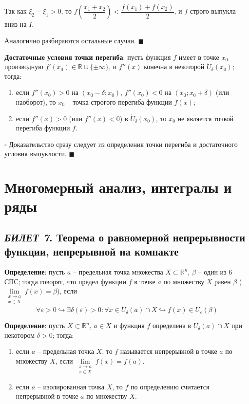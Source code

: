 \documentclass[12pt, a4paper, reqno]{article}
\begin{document}
    Так как $\xi_2 - \xi_1 > 0$, то $f\left(\dfrac{x_1 + x_2}{2}\right) < \dfrac{f(x_1) + f(x_2)}{2}$,
    и $f$ строго выпукла вниз на $I$.

    Аналогично разбираются остальные случаи. $\blacksquare$

    \textbf{Достаточные условия точки перегиба}: пусть функция $f$ имеет в точке $x_0$ производную
    $f'(x_0) \in \mathbb{R} \cup \{\pm\infty\}$, и $f''(x)$ конечна в некоторой $\mathring U_{\delta}(x_0)$;
    тогда:
    \begin{enumerate}
        \item если $f''(x_0) > 0$ на $(x_0 - \delta; x_0)$, $f''(x_0) < 0$ на $(x_0; x_0 + \delta)$
              (или наоборот), то $x_0$ -- точка строгого перегиба функции $f(x)$;
        \item если $f''(x) > 0$ (или $f''(x) < 0$) в $\mathring U_{\delta}(x_0)$, то $x_0$ не является
              точкой перегиба функции $f$.
    \end{enumerate}

    $\square$ Доказательство сразу следует из определения точки перегиба и достаточного условия
    выпуклости. $\blacksquare$

\newpage

\section{Многомерный анализ, интегралы и ряды}

\subsection{\textit{БИЛЕТ 7}. Теорема о равномерной непрерывности функции, непрерывной на компакте}

    \textbf{Определение}: пусть $a$ -- предельная точка множества $X \subset \mathbb{R}^n$,
    $\beta$ -- один из 6 СПС; тогда говорят, что предел функции $f$ в точке $a$ по множеству $X$
    равен $\beta$ ($\lim\limits_{\substack{x \to a \\ x \in X}} f(x) = \beta$), если
    \begin{equation*}
        \forall \varepsilon > 0 \hookrightarrow \exists \delta(\varepsilon) > 0 : \forall x \in
        \mathring U_{\delta}(a) \cap X \hookrightarrow f(x) \in U_{\varepsilon}(\beta)
    \end{equation*}

    \textbf{Определение}: пусть $X \subset \mathbb{R}^n$, $a \in X$ и функция $f$ определена в
    $U_{\delta}(a) \cap X$ при некотором $\delta > 0$; тогда:
    \begin{enumerate}
        \item если $a$ -- предельная точка $X$, то $f$ называется непрерывной в точке $a$ по
        множеству $X$, если $\lim\limits_{\substack{x \to a \\ x \in X}} f(x) = f(a)$.
        \item если $a$ -- изолированная точка $X$, то $f$ по определению считается непрерывной в
        точке $a$ по множеству $X$.
    \end{enumerate}
\end{document}
